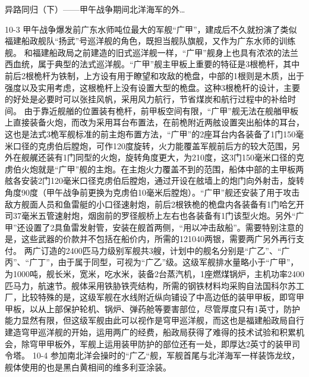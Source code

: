 \documentclass[12pt,UTF8]{ctexbook}
\begin{document}
异路同归（下）——甲午战争期间北洋海军的外…

10-3
甲午战争爆发前广东水师吨位最大的军舰“广甲”，建成后不久就扮演了类似福建船政舰队“扬武”号巡洋舰的角色，既担当舰队旗舰，又作为广东水师的训练舰。
和福建船政局之前建造的旧式巡洋舰一样，“广甲”舰身上也具有浓浓的法兰西血统，属于典型的法式巡洋舰。“广甲”舰主甲板上重要的特征是3根桅杆，其中前后2根桅杆为铁制，上方设有用于瞭望和攻敌的桅盘，中部的1根则是木质，出于强度以及实用考虑，这根桅杆上没有设置大型的桅盘。这种3根桅杆的设计，主要的好处是必要时可以张挂风帆，采用风力航行，节省煤炭和航行过程中的补给时间。
由于靠近舰艏的位置装有桅杆，前甲板空间有限，“广甲”舰无法在舰艏甲板上直接装备火炮，而改为采用耳台布置法，在前桅附近两舷设置突出船体的耳台，这也是法式3桅军舰标准的前主炮布置方法，“广甲”的2座耳台内各装备了1门150毫米口径的克虏伯后膛炮，可作120度旋转，火力能覆盖军舰前后方的较大范围，另外在舰艉还装有1门同型的火炮，旋转角度更大，为210度，这3门150毫米口径的克虏伯火炮就是“广甲”舰的主炮。在主炮火力覆盖不到的范围，船体中部的主甲板两舷各安装2门120毫米口径克虏伯后膛炮，通过开设在舷墙上的炮门向外射击，旋转角度90度（甲午战争前更换为克虏伯10毫米后膛炮）。“广甲”舰还安装了用于攻击敌方舰面人员和鱼雷艇的小口径速射炮，前后2根铁桅的桅盘内各装备有1门哈乞开司37毫米五管速射炮，烟囱前的罗径舰桥上左右也各装备有1门该型火炮。另外“广甲”还设置了2具鱼雷发射管，安装在舰首两侧，“用以冲击敌船”。需要特别注意的是，这些武器的价款并不包括在船价内，所需的121040两银，需要两广另外再行支付。
两广订造的2400匹马力级别军舰共3艘，计划中的舰名分别是“广乙”、“广丙”、“广丁”，由于属于同型，可视为“广乙”级。这级军舰排水量略小于“广甲”，为1000吨，舰长米，宽米，吃水米，装备2台蒸汽机，1座燃煤锅炉，主机功率2400匹马力，航速节。舰体采用铁胁铁壳结构，所需的钢铁材料均采购自法国科尔苏工厂，比较特殊的是，这级军舰在水线附近纵向铺设了中高边低的装甲甲板，即穹甲甲板，以从上部保护轮机、锅炉、弹药舱等要害部位，尽管厚度只有1英寸，防护能力显然有限，但这级军舰由此可以视作是穹甲巡洋舰，而这也是福建船政局自行建造穹甲巡洋舰的开始，运用两广的经费，船政局获得了难得的技术试验和积累机会，除穹甲甲板外，军舰上运用装甲防护的部位还有一处，即厚达2英寸的装甲司令塔。
10-4
参加南北洋会操时的“广乙“舰，军舰首尾与北洋海军一样装饰龙纹，舰体使用的也是黑白黄相间的维多利亚涂装。
\end{document}
